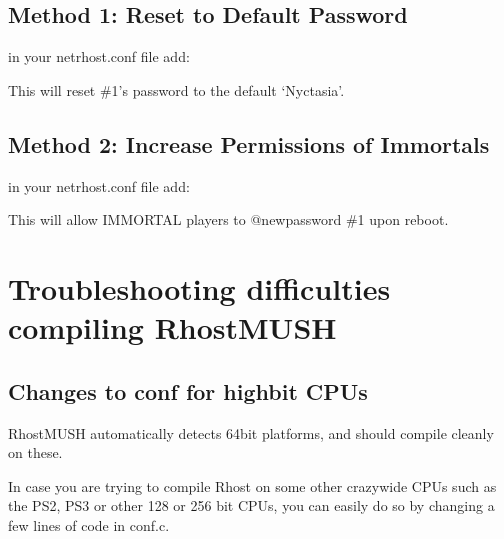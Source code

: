 \documentclass[letterpaper,10pt,english]{sphinxmanual}
\begin{document}
\subsection{Method 1: Reset to Default Password}
\label{\detokenize{troubleshooting:method-1-reset-to-default-password}}
\sphinxAtStartPar
in your netrhost.conf file add:

\begin{sphinxVerbatim}[commandchars=\\\{\}]
 
\end{sphinxVerbatim}

\sphinxAtStartPar
This will reset \#1’s password to the default ‘Nyctasia’.


\subsection{Method 2: Increase Permissions of Immortals}
\label{\detokenize{troubleshooting:method-2-increase-permissions-of-immortals}}
\sphinxAtStartPar
in your netrhost.conf file add:

\begin{sphinxVerbatim}[commandchars=\\\{\}]
 
\end{sphinxVerbatim}

\sphinxAtStartPar
This will allow IMMORTAL players to @newpassword \#1 upon reboot.


\section{Troubleshooting difficulties compiling RhostMUSH}
\label{\detokenize{troubleshooting:troubleshooting-difficulties-compiling-rhostmush}}

\subsection{Changes to conf for high\sphinxhyphen{}bit CPUs}
\label{\detokenize{troubleshooting:changes-to-conf-for-high-bit-cpus}}
\sphinxAtStartPar
RhostMUSH automatically detects 64\sphinxhyphen{}bit platforms, and should compile
cleanly on these.

\sphinxAtStartPar
In case you are trying to compile Rhost on some other crazy\sphinxhyphen{}wide CPUs
such as the PS2, PS3 or other 128 or 256 bit CPUs, you can easily do
so by changing a few lines of code in conf.c.
\end{document}
